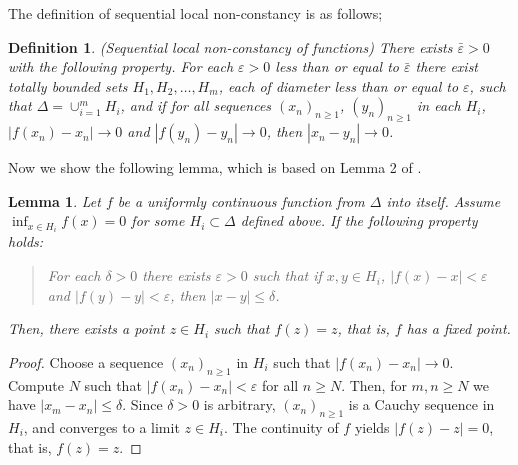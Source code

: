 \documentclass[reqno]{amsart}
\newtheorem{lem}{Lemma}
\newtheorem{definition}{Definition}
\begin{document}
The definition of sequential local non-constancy is as follows;
\begin{definition}(Sequential local non-constancy of functions)
There exists $\bar{\varepsilon}>0$ with the following property. For each $\varepsilon>0$ less than or equal to $\bar{\varepsilon}$ there exist totally bounded sets $H_1, H_2, \dots, H_m$, each of diameter less than or equal to $\varepsilon$, such that $\Delta=\cup_{i=1}^m H_i$, and if for all sequences $(x_n)_{n\geq 1}$, $(y_n)_{n\geq 1}$ in each $H_i$, $|f(x_n)-x_n|\longrightarrow 0$ and $|f(y_n)-y_n|\longrightarrow 0$, then $|x_n-y_n|\longrightarrow 0$.
\end{definition}

Now we show the following lemma, which is based on Lemma 2 of \cite{berg}.
\begin{lem}
Let $f$ be a uniformly continuous function from $\Delta$ into itself. Assume $\inf_{x\in H_i}f(x)=0$ for some $H_i\subset \Delta$ defined above. If the following property holds:
\begin{quote}
For each $\delta>0$ there exists $\varepsilon>0$ such that if $x, y\in H_i$, $|f(x)-x|<\varepsilon$ and $|f(y)-y|<\varepsilon$, then $|x-y|\leq \delta$.
\end{quote}
Then, there exists a point $z\in H_i$ such that $f(z)=z$, that is, $f$ has a fixed point. \label{fix0}
\end{lem}
\begin{proof}
Choose a sequence $(x_n)_{n\geq 1}$ in $H_i$ such that $|f(x_n)-x_n|\longrightarrow 0$. Compute $N$ such that $|f(x_n)-x_n|<\varepsilon$ for all $n\geq N$. Then, for $m, n\geq N$ we have $|x_m-x_n|\leq \delta$. Since $\delta>0$ is arbitrary, $(x_n)_{n\geq 1}$ is a Cauchy sequence in $H_i$, and converges to a limit $z\in H_i$. The continuity of $f$ yields $|f(z)-z|=0$, that is, $f(z)=z$.
\end{proof}
\end{document}
